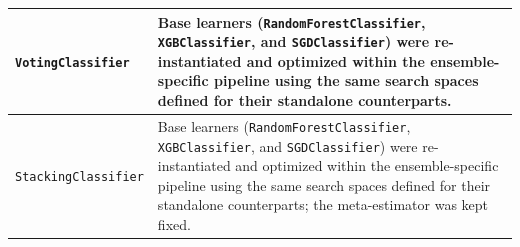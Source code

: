 \documentclass[conference]{IEEEtran}
\begin{document}
\begin{table}[t]
\begin{threeparttable}
\begin{tabular}{p{4.5cm} p{12.8cm}}
\texttt{VotingClassifier} &
Base learners (\texttt{RandomForestClassifier}, \texttt{XGBClassifier}, and \texttt{SGDClassifier}) were re-instantiated and optimized within the ensemble-specific pipeline using the same search spaces defined for their standalone counterparts. \\
\midrule

\texttt{StackingClassifier} &
Base learners (\texttt{RandomForestClassifier}, \texttt{XGBClassifier}, and \texttt{SGDClassifier}) were re-instantiated and optimized within the ensemble-specific pipeline using the same search spaces defined for their standalone counterparts; the meta-estimator was kept fixed. \\

\bottomrule
\end{tabular}
\end{threeparttable}
\end{table}
\end{document}
